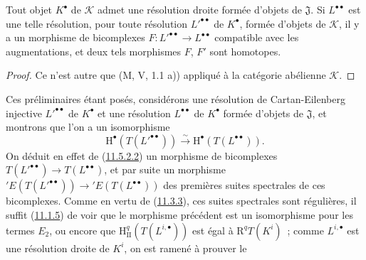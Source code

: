 \begin{corollary}[11.5.2.2]
\label{0.11.5.2.2-fr}
Tout objet $K^\bullet$ de $\mathcal K$ admet une résolution droite formée
d'objets de $\mathfrak J$. Si $L^{\bullet\bullet}$ est une telle résolution,
pour toute résolution $L'^{\bullet\bullet}$ de $K^\bullet$, formée d'objets
de $\mathcal K$, il y a un morphisme de bicomplexes
$F:L'^{\bullet\bullet}\to L^{\bullet\bullet}$ compatible avec les
augmentations, et deux tels morphismes $F$, $F'$ sont homotopes.
\end{corollary}

\begin{proof}
Ce n'est autre que (M, V, 1.1 a)) appliqué à la catégorie abélienne
$\mathcal K$.
\end{proof}

\begin{env}[11.5.2.3]
\label{0.11.5.2.3-fr}
Ces préliminaires étant posés, considérons une résolution de
Cartan-Eilenberg injective $L'^{\bullet\bullet}$ de $K^\bullet$ et une
résolution $L^{\bullet\bullet}$ de $K^\bullet$ formée d'objets de
$\mathfrak J$, et montrons que l'on a un isomorphisme
\[
  \mathrm H^\bullet(T(L'^{\bullet\bullet}))\xrightarrow{\sim}
  \mathrm H^\bullet(T(L^{\bullet\bullet})).
\]
On déduit en effet de (\hyperref[0.11.5.2.2-fr]{11.5.2.2}) un morphisme de
bicomplexes $T(L'^{\bullet\bullet})\to T(L^{\bullet\bullet})$, et par suite
un morphisme
$'E(T(L'^{\bullet\bullet}))\to{}'E(T(L^{\bullet\bullet}))$ des premières
suites spectrales de ces bicomplexes. Comme en vertu de
(\hyperref[0.11.3.3-fr]{11.3.3}), ces suites spectrales sont régulières, il
suffit (\hyperref[0.11.1.5-fr]{11.1.5}) de voir que le morphisme précédent est
un isomorphisme pour les termes $E_2$, ou encore que
$\mathrm H_{\mathrm{II}}^q(T(L^{i,\bullet}))$ est égal à
$\mathrm R^qT(K^i)$~; comme $L^{i,\bullet}$ est une résolution droite de
$K^i$, on est ramené à prouver le
\end{env}

